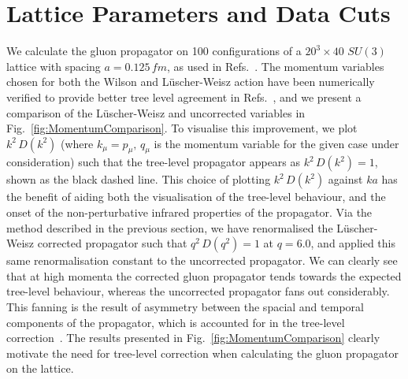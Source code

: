 \section{Lattice Parameters and Data Cuts} \label{sec:LatticeParameters}
We calculate the gluon propagator on 100 configurations of a $20^3\times 40$ $SU(3)$ lattice with spacing $a=0.125\,\si{fm}$, as used in Refs.~\cite{Trewartha:2015nna,OMalley:2011aa}. The momentum variables chosen for both the Wilson and L\"uscher-Weisz action have been numerically verified to provide better tree level agreement in Refs.~\cite{Marenzoni:1994ap, Bonnet:2001uh}, and we present a comparison of the L\"uscher-Weisz and uncorrected variables in Fig.~\ref{fig:MomentumComparison}. To visualise this improvement, we plot $k^2\,D(k^2)$ (where $k_\mu=p_\mu,\,q_\mu$ is the momentum variable for the given case under consideration) such that the tree-level propagator appears as $k^2\,D(k^2)=1$, shown as the black dashed line. This choice of plotting $k^2\,D(k^2)$ against $ka$ has the benefit of aiding both the visualisation of the tree-level behaviour, and the onset of the non-perturbative infrared properties of the propagator. Via the method described in the previous section, we have renormalised the L\"uscher-Weisz corrected propagator such that $q^2\,D(q^2) = 1$ at $q=6.0$, and applied this same renormalisation constant to the uncorrected propagator. We can clearly see that at high momenta the corrected gluon propagator tends towards the expected tree-level behaviour, whereas the uncorrected propagator fans out considerably. This fanning is the result of asymmetry between the spacial and temporal components of the propagator, which is accounted for in the tree-level correction~\cite{Marenzoni:1994ap}. The results presented in Fig.~\ref{fig:MomentumComparison} clearly motivate the need for tree-level correction when calculating the gluon propagator on the lattice.\\ 
%
